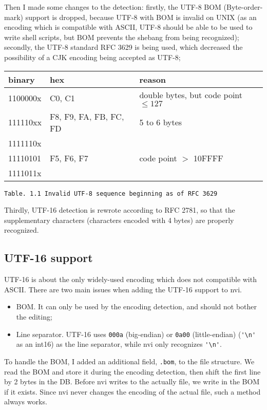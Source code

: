 \documentclass[11pt,twoside,a4paper]{article}
\begin{document}
\begin{mla}
Then I made some changes to the detection: firstly, the UTF-8 BOM
(Byte-order-mark) support is dropped, because UTF-8 with BOM is invalid on
UNIX (as an encoding which is compatible with ASCII, UTF-8 should be able to
be used to write shell scripts, but BOM prevents the shebang from being
recognized); secondly, the UTF-8 standard RFC 3629 is being used, which
decreased the possibility of a CJK encoding being accepted as UTF-8;
\\

\begin{tabular}{|p{1in}|l|l|}
\hline
binary & hex & reason \\
\hline
1100000x & C0, C1 & double bytes, but code point $\le 127$ \\
\hline
111110xx & F8, F9, FA, FB, FC, FD & 5 to 6 bytes \\
1111110x &  & \\
\hline
11110101 & F5, F6, F7 & code point $>$ 10FFFF \\
1111011x & & \\
\hline
\end{tabular}

\begin{center}
	\texttt{\small{Table. 1.1 Invalid UTF-8 sequence beginning as of RFC
			3629 \cite{5}}}
\end{center}

Thirdly,
UTF-16 detection is rewrote according to RFC 2781, so that the supplementary
characters\cite{6} (characters encoded with 4 bytes) are properly recognized.

\subsection{UTF-16 support}

UTF-16 is about the only widely-used encoding which does not compatible with
ASCII. There are two main issues when adding the UTF-16 support to nvi.

\begin{itemize}
	\item BOM. It can only be used by the encoding detection, and should not
		bother the editing;
	\item Line separator. UTF-16 uses \verb|000a| (big-endian) or
		\verb|0a00| (little-endian) (\verb|'\n'| as an int16) as the line
		separator, while nvi only recognizes \verb|'\n'|.
\end{itemize}

To handle the BOM, I added an additional field, \verb|.bom|, to the file
structure. We read the BOM and store it during the encoding detection, then
shift the first line by 2 bytes in the DB. Before nvi writes to the actually
file, we write in the BOM if it exists. Since nvi never changes the encoding
of the actual file, such a method always works.


\end{mla}
\end{document}
